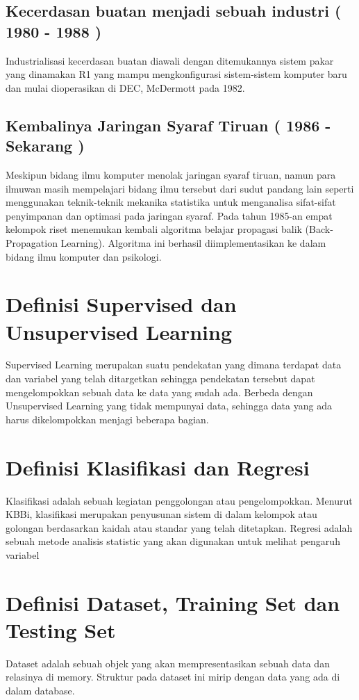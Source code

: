 \documentclass{homework}
\begin{document}
\subsection{Kecerdasan buatan menjadi sebuah industri ( 1980 - 1988 )}
Industrialisasi kecerdasan buatan diawali dengan ditemukannya sistem pakar yang dinamakan R1 yang mampu mengkonfigurasi sistem-sistem komputer baru dan mulai dioperasikan di DEC, McDermott pada 1982.

\subsection{Kembalinya Jaringan Syaraf Tiruan ( 1986 - Sekarang )}
Meskipun bidang ilmu komputer menolak jaringan syaraf tiruan, namun para ilmuwan masih mempelajari bidang ilmu tersebut dari sudut pandang lain seperti menggunakan teknik-teknik mekanika statistika untuk menganalisa sifat-sifat penyimpanan dan optimasi pada jaringan syaraf.
Pada tahun 1985-an  empat kelompok riset menemukan kembali algoritma belajar propagasi balik (Back-Propagation Learning). Algoritma ini berhasil diimplementasikan ke dalam bidang ilmu komputer dan psikologi.

\section{Definisi Supervised dan Unsupervised Learning}
Supervised Learning merupakan suatu pendekatan yang dimana terdapat data dan variabel yang telah ditargetkan sehingga pendekatan tersebut dapat mengelompokkan sebuah data ke data yang sudah ada. Berbeda dengan Unsupervised Learning yang tidak mempunyai data, sehingga data yang ada harus dikelompokkan menjagi beberapa bagian.

\section{Definisi Klasifikasi dan Regresi}
Klasifikasi adalah sebuah kegiatan penggolongan atau pengelompokkan. Menurut KBBi, klasifikasi merupakan penyusunan sistem di dalam kelompok atau golongan berdasarkan kaidah atau standar yang telah ditetapkan. 
Regresi adalah sebuah metode analisis statistic yang akan digunakan untuk melihat pengaruh variabel

\section{Definisi Dataset, Training Set dan Testing Set}
Dataset adalah sebuah objek yang akan mempresentasikan sebuah data dan relasinya di memory. Struktur pada dataset ini mirip dengan data yang ada di dalam database. 
\end{document}
